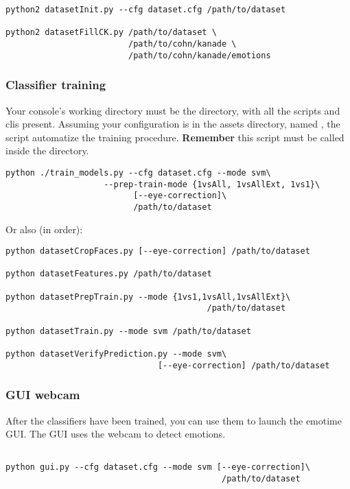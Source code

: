 \begin{verbatim}
python2 datasetInit.py --cfg dataset.cfg /path/to/dataset

python2 datasetFillCK.py /path/to/dataset \
                         /path/to/cohn/kanade \
                         /path/to/cohn/kanade/emotions
\end{verbatim}

\subsubsection*{Classifier training}

Your console's working directory must be the  directory,
with all the scripts and clis present. Assuming your configuration is in the
assets directory, named \code{dataset.cfg}, the script 
automatize the training procedure. \textbf{Remember} this script must be called
inside the \code{assets} directory.

\begin{verbatim}
python ./train_models.py --cfg dataset.cfg --mode svm\
                    --prep-train-mode {1vsAll, 1vsAllExt, 1vs1}\
                          [--eye-correction]\
                          /path/to/dataset
\end{verbatim}

Or also (in order):

\begin{verbatim}
python datasetCropFaces.py [--eye-correction] /path/to/dataset

python datasetFeatures.py /path/to/dataset

python datasetPrepTrain.py --mode {1vs1,1vsAll,1vsAllExt}\
                                         /path/to/dataset

python datasetTrain.py --mode svm /path/to/dataset

python datasetVerifyPrediction.py --mode svm\
                               [--eye-correction] /path/to/dataset
\end{verbatim}

\subsubsection*{GUI webcam}

After the classifiers have been trained, you can use them to launch the emotime
GUI\@. The GUI uses the webcam to detect emotions.

\begin{verbatim}

python gui.py --cfg dataset.cfg --mode svm [--eye-correction]\
                                            /path/to/dataset
\end{verbatim}
